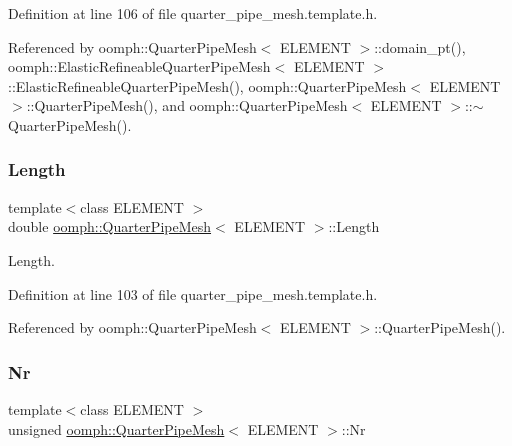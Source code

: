 Definition at line 106 of file quarter\+\_\+pipe\+\_\+mesh.\+template.\+h.



Referenced by oomph\+::\+Quarter\+Pipe\+Mesh$<$ E\+L\+E\+M\+E\+N\+T $>$\+::domain\+\_\+pt(), oomph\+::\+Elastic\+Refineable\+Quarter\+Pipe\+Mesh$<$ E\+L\+E\+M\+E\+N\+T $>$\+::\+Elastic\+Refineable\+Quarter\+Pipe\+Mesh(), oomph\+::\+Quarter\+Pipe\+Mesh$<$ E\+L\+E\+M\+E\+N\+T $>$\+::\+Quarter\+Pipe\+Mesh(), and oomph\+::\+Quarter\+Pipe\+Mesh$<$ E\+L\+E\+M\+E\+N\+T $>$\+::$\sim$\+Quarter\+Pipe\+Mesh().

\mbox{\label{classoomph_1_1QuarterPipeMesh_a00530b53de926a9a4f37cace7e2ffbdb}} 
\subsubsection{\texorpdfstring{Length}{Length}}
{\footnotesize\ttfamily template$<$class E\+L\+E\+M\+E\+NT $>$ \\
double \hyperlink{classoomph_1_1QuarterPipeMesh}{oomph\+::\+Quarter\+Pipe\+Mesh}$<$ E\+L\+E\+M\+E\+NT $>$\+::Length\hspace{0.3cm}{\ttfamily [protected]}}



Length. 



Definition at line 103 of file quarter\+\_\+pipe\+\_\+mesh.\+template.\+h.



Referenced by oomph\+::\+Quarter\+Pipe\+Mesh$<$ E\+L\+E\+M\+E\+N\+T $>$\+::\+Quarter\+Pipe\+Mesh().

\mbox{\label{classoomph_1_1QuarterPipeMesh_a8e6896852024ecf017ab687926fb3ef3}} 
\subsubsection{\texorpdfstring{Nr}{Nr}}
{\footnotesize\ttfamily template$<$class E\+L\+E\+M\+E\+NT $>$ \\
unsigned \hyperlink{classoomph_1_1QuarterPipeMesh}{oomph\+::\+Quarter\+Pipe\+Mesh}$<$ E\+L\+E\+M\+E\+NT $>$\+::Nr\hspace{0.3cm}{\ttfamily [protected]}}



